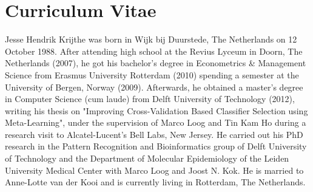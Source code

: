 \chapter{Curriculum Vitae}
Jesse Hendrik Krijthe was born in Wijk bij Duurstede, The Netherlands on 12 October 1988. After attending high school at the Revius Lyceum in Doorn, The Netherlands (2007), he got his bachelor's degree in Econometrics \& Management Science from Erasmus University Rotterdam (2010) spending a semester at the University of Bergen, Norway (2009). Afterwards, he obtained a master's degree in Computer Science (cum laude) from Delft University of Technology (2012), writing his thesis on "Improving Cross-Validation Based Classifier Selection using Meta-Learning", under the supervision of Marco Loog and Tin Kam Ho during a research visit to Alcatel-Lucent's Bell Labs, New Jersey. He carried out his PhD research in the Pattern Recognition and Bioinformatics group of Delft University of Technology and the Department of Molecular Epidemiology of the Leiden University Medical Center with Marco Loog and Joost N. Kok. He is married to Anne-Lotte van der Kooi and is currently living in Rotterdam, The Netherlands.

\renewcommand*{\bibfont}{\small}  
\newrefcontext[sorting=none]
\begin{refsection}
\nocite{Krijthe2017projection} %
\nocite{Krijthe2017} %
\nocite{Krijthe2016limits} %
\nocite{Krijthe2016a} %
\nocite{Krijthe2016} %
\nocite{Krijthe2016rssl} %
\nocite{Krijthe2016reproducing} %
\nocite{Kouw2016} %
\nocite{Taskesen2016} %
\nocite{Loog2016a} %
\nocite{Krijthe2015} %
\nocite{Krijthe2014} %
\nocite{Krijthe2012b} %
\printbibliography[heading=subbibliography,title={Publications}]

\end{refsection}
